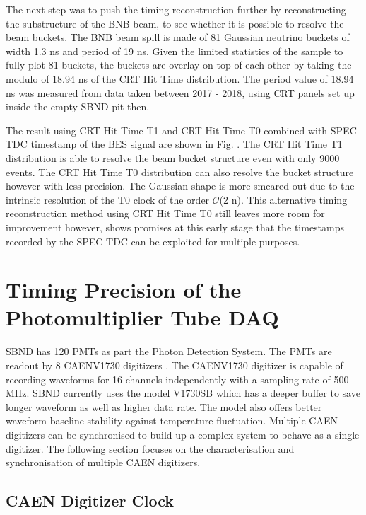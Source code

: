 The next step was to push the timing reconstruction further by reconstructing the substructure of the BNB beam, to see whether it is possible to resolve the beam buckets.
The BNB beam spill is made of 81 Gaussian neutrino buckets of width 1.3 ns and period of 19 ns.
Given the limited statistics of the sample to fully plot 81 buckets, the buckets are overlay on top of each other by taking the modulo of 18.94 ns of the CRT Hit Time distribution.
The period value of 18.94 ns was measured from data taken between 2017 - 2018, using CRT panels set up inside the empty SBND pit then.

The result using CRT Hit Time T1 and CRT Hit Time T0 combined with SPEC-TDC timestamp of the BES signal are shown in Fig. {}.
The CRT Hit Time T1 distribution is able to resolve the beam bucket structure even with only 9000 events.
The CRT Hit Time T0 distribution can also resolve the bucket structure however with less precision. 
The Gaussian shape is more smeared out due to the intrinsic resolution of the T0 clock of the order $\mathcal{O}$(2 n).
This alternative timing reconstruction method using CRT Hit Time T0 still leaves more room for improvement however, shows promises at this early stage that the timestamps recorded by the SPEC-TDC can be exploited for multiple purposes.

\section{Timing Precision of the Photomultiplier Tube DAQ}
\label{section5.4}

SBND has 120 PMTs as part the Photon Detection System. 
The PMTs are readout by 8 CAENV1730 digitizers \cite{}.
The CAENV1730 digitizer is capable of recording waveforms for 16 channels independently with a sampling rate of 500 MHz.
SBND currently uses the model V1730SB which has a deeper buffer to save longer waveform as well as higher data rate.
The model also offers better waveform baseline stability against temperature fluctuation.
Multiple CAEN digitizers can be synchronised to build up a complex system to behave as a single digitizer.
The following section focuses on the characterisation and synchronisation of multiple CAEN digitizers.

\subsection{CAEN Digitizer Clock}

